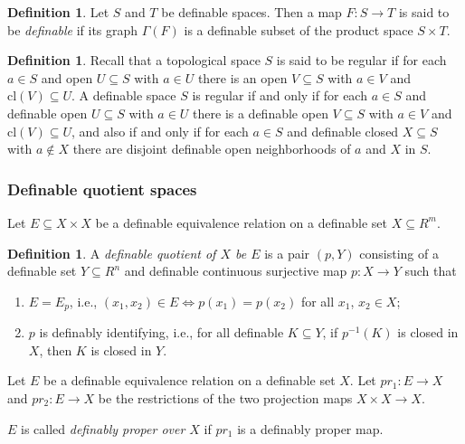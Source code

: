 \documentclass{amsart}
\theoremstyle{definition}
\newtheorem{definition}[theorem]{Definition}
\numberwithin{equation}{section}
\begin{document}
\begin{definition}
    Let $S$ and $T$ be definable spaces.
    Then a map $F: S \to T$ is said to be \emph{definable} if its graph $\Gamma(F)$ is a definable subset of
    the product space $S \times T$.
\end{definition}

\begin{definition}
    Recall that a topological space $S$ is said to be regular if for each $a \in  S$ and
    open $U \subseteq S$ with $a \in U$ there is an open $V \subseteq S$ with $a \in V$ and $\mathrm{cl}(V) \subseteq U$.
    A definable space $S$ is regular if and only if for each $a \in S$ and definable open $U \subseteq S$ with $a \in U$
    there is a definable open $V \subseteq S$ with $a \in V$ and $\mathrm{cl}(V) \subseteq U$,
    and also if and only if for each $a \in S$ and definable closed $X \subseteq S$ with $a \notin X$
    there are disjoint definable open neighborhoods of $a$ and $X$ in $S$.
\end{definition}

\subsubsection{Definable quotient spaces}

Let $E \subseteq X\times X$ be a definable equivalence relation on a definable set $X \subseteq R^m$.

\begin{definition}
    A \emph{definable quotient of $X$ be $E$} is a pair $(p,Y)$ consisting of a definable set $Y \subseteq R^n$ and definable continuous surjective map $p: X\to Y$ such that 
    \begin{enumerate}[label = {(\roman*)}]
        \item $E = E_p$, i.e., $(x_1,x_2) \in E \iff p(x_1) = p(x_2)$ for all $x_1$, $x_2 \in X$;
        \item $p$ is definably identifying, i.e., for all definable $K \subseteq Y$, if $p^{-1}(K)$ is closed in $X$, then $K$ is closed in $Y$.
    \end{enumerate}
\end{definition}

Let $E$ be a definable equivalence relation on a definable set $X$.
Let $pr_1 : E \to X$ and $pr_2 : E \to X$ be the restrictions of the two projection maps $X\times X \to X$.

$E$ is called \emph{definably proper over $X$} if $pr_1$ is a definably proper map.
\end{document}
